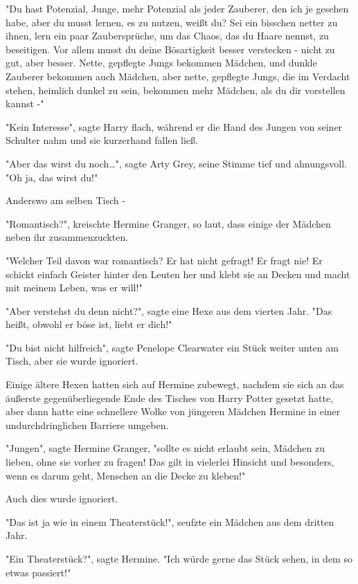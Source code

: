 {"Du hast Potenzial, Junge, mehr Potenzial als jeder Zauberer, den ich je gesehen habe, aber du musst lernen, es zu nutzen, weißt du? Sei ein bisschen netter zu ihnen, lern ein paar Zaubersprüche, um das Chaos, das du Haare nennst, zu beseitigen. Vor allem musst du deine Bösartigkeit besser verstecken - nicht zu gut, aber besser. Nette, gepflegte Jungs bekommen Mädchen, und dunkle Zauberer bekommen auch Mädchen, aber nette, gepflegte Jungs, die im Verdacht stehen, heimlich dunkel zu sein, bekommen mehr Mädchen, als du dir vorstellen kannst -"

"Kein Interesse", sagte Harry flach, während er die Hand des Jungen von seiner Schulter nahm und sie kurzerhand fallen ließ.

"Aber das wirst du noch…", sagte Arty Grey, seine Stimme tief und ahnungsvoll. "Oh ja, das wirst du!"

Anderswo am selben Tisch -

"Romantisch?", kreischte Hermine Granger, so laut, dass einige der Mädchen neben ihr zusammenzuckten.

"Welcher Teil davon war romantisch? Er hat nicht gefragt! Er fragt nie! Er schickt einfach Geister hinter den Leuten her und klebt sie an Decken und macht mit meinem Leben, was er will!"

"Aber verstehst du denn nicht?", sagte eine Hexe aus dem vierten Jahr. "Das heißt, obwohl er böse ist, liebt er dich!"

"Du bist nicht hilfreich", sagte Penelope Clearwater ein Stück weiter unten am Tisch, aber sie wurde ignoriert.

Einige ältere Hexen hatten sich auf Hermine zubewegt, nachdem sie sich an das äußerste gegenüberliegende Ende des Tisches von Harry Potter gesetzt hatte, aber dann hatte eine schnellere Wolke von jüngeren Mädchen Hermine in einer undurchdringlichen Barriere umgeben.

"Jungen", sagte Hermine Granger, "sollte es nicht erlaubt sein, Mädchen zu lieben, ohne sie vorher zu fragen! Das gilt in vielerlei Hinsicht und besonders, wenn es darum geht, Menschen an die Decke zu kleben!"

Auch dies wurde ignoriert.

"Das ist ja wie in einem Theaterstück!", seufzte ein Mädchen aus dem dritten Jahr.

"Ein Theaterstück?", sagte Hermine. "Ich würde gerne das Stück sehen, in dem so etwas passiert!"

}
